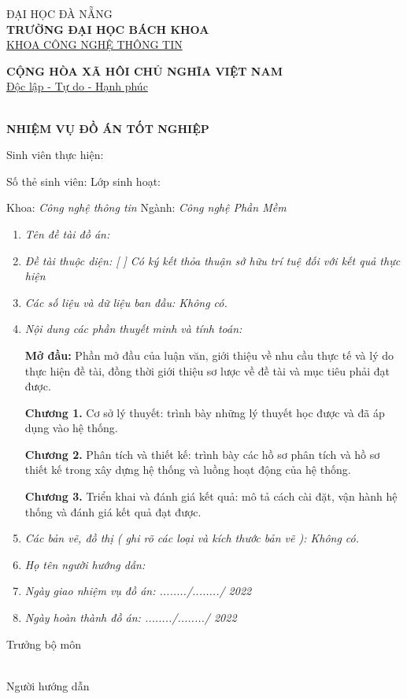 
\begin{minipage}[t]{.4\textwidth}
	\centering
	ĐẠI HỌC ĐÀ NẴNG\\
	\textbf{TRƯỜNG ĐẠI HỌC BÁCH KHOA}\\
	\underline{KHOA CÔNG NGHỆ THÔNG TIN}
\end{minipage}\hfill 
\begin{minipage}[t]{.6\textwidth}
	\centering
	\textbf{CỘNG HÒA XÃ HÔI CHỦ NGHĨA VIỆT NAM}\\
	\underline{Độc lập - Tự do - Hạnh phúc}
\end{minipage}\\[2em]

\center\Large\textbf{NHIỆM VỤ ĐỒ ÁN TỐT NGHIỆP}

Sinh viên thực hiện: \emph\@author \dotfill

Số thẻ sinh viên: \emph\msv \dotfill Lớp sinh hoạt: \emph\myclass \dotfill

Khoa: \emph{Công nghệ thông tin} \dotfill  Ngành: \emph{Công nghệ Phần Mềm} \dotfill

\begin{enumerate}
	\item\emph{Tên đề tài đồ án: \@title}
	\item\emph{Đề tài thuộc diện: [ ] Có ký kết thỏa thuận sở hữu trí tuệ đối với kết quả thực hiện}
	\item\emph{Các số liệu và dữ liệu ban đầu: Không có.}
	\item\emph{Nội dung các phần thuyết minh và tính toán:}
	
	\textbf{Mở đầu:} Phần mở đầu của luận văn, giới thiệu về nhu cầu thực tế và lý do thực hiện đề tài, đồng thời giới thiệu sơ lược về đề tài và mục tiêu phải đạt được.
	
	\textbf{Chương 1.} Cơ sở lý thuyết: trình bày những lý thuyết học được và đã áp dụng vào hệ thống.
	
	\textbf{Chương 2.} Phân tích và thiết kế: trình bày các hồ sơ phân tích và hồ sơ thiết kế trong xây dựng hệ thống và luồng hoạt động của hệ thống.
	
	\textbf{Chương 3.} Triển khai và đánh giá kết quả: mô tả cách cài đặt, vận hành hệ thống và đánh giá kết quả đạt được.
	\item\emph{Các bản vẽ, đồ thị ( ghi rõ các loại và kích thước bản vẽ ):
	Không có.}
	\item\emph{Họ tên người hướng dẫn: \advisor}
	\item\emph{Ngày giao nhiệm vụ đồ án: ......../......../ 2022 \dotfill}
	\item\emph{Ngày hoàn thành đồ án: ......../......../ 2022 \dotfill}
	
\end{enumerate}
\raggedright
\begin{minipage}[t]{.5\textwidth}
	
	Trưởng bộ môn \dotfill
\end{minipage}\hfill 
\begin{minipage}[t]{.5\textwidth}
	\center
	\@date\\
	Người hướng dẫn
\end{minipage}\\[2em]

\pagebreak